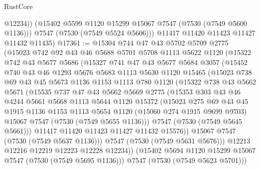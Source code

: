 \begin{lexlean}{RustCore}
\begin{coremodule}
            @12234))
        (@15402 @5599 @1120 @15299 @15067 @7547 (@7530 (@7549 @5600 @1136)))
        @7547
        (@7530 (@7549 @5524 @5606)))
      @11417
      @11420
      @11423
      @11427
      @11432
      @11435)
@17361 := @15304
    @744
    @47
    @43
    @5702
    @5709
    @2775
    (@15023
      @742
      @92
      @43
      @46
      @5688
      @5701
      @5708
      @1113
      @5622
      @1120
      (@15322
        @742
        @43
        @5677
        @5686
        (@15327
          @741
          @47
          @43
          @5677
          @5684
          @3057
          (@15452
            @740
            @43
            @46
            @1293
            @5676
            @5683
            @1113
            @5630
            @1120
            @15465
            (@15023
              @738
              @69
              @43
              @45
              @5673
              @1136
              @1153
              @1113
              @780
              @1120
              (@15322
                @738
                @43
                @5662
                @5671
                (@15535
                  @737
                  @47
                  @43
                  @5662
                  @5669
                  @2775
                  (@15353
                    @303
                    @43
                    @46
                    @4244
                    @5661
                    @5668
                    @1113
                    @5644
                    @1120
                    @15372
                    (@15023
                      @275
                      @69
                      @43
                      @45
                      @1915
                      @1136
                      @1153
                      @1113
                      @5654
                      @1120
                      (@15060 @274 @1915 @9699 @9703)
                      @15067
                      @7547
                      (@7530 (@7549 @5655 @1136)))
                    @7547
                    (@7530 (@7549 @5645 @5661)))
                  @11417
                  @11420
                  @11423
                  @11427
                  @11432
                  @15576))
              @15067
              @7547
              (@7530 (@7549 @5637 @1136)))
            @7547
            (@7530 (@7549 @5631 @5676)))
          @12213
          @12216
          @12219
          @12223
          @12228
          @12234))
      (@15402 @5694 @1120 @15299 @15067 @7547 (@7530 (@7549 @5695 @1136)))
      @7547
      (@7530 (@7549 @5623 @5701)))

\end{coremodule}
\end{lexlean}
